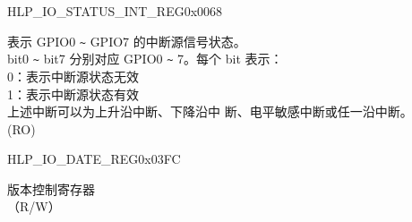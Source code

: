 \begin{register}{H}{LP\_IO\_STATUS\_INT\_REG}{0x0068}\label{regdesc:LPIOSTATUSINTREG}
%
%
\regnewline%
\begin{regdesc}\begin{reglist}
\label{fielddesc:LPGPIOSTATUSINTNEXT}\item [LP\_GPIO\_STATUS\_INT\_NEXT] 表示 GPIO0 \verb+~+ GPIO7 的中断源信号状态。\\
bit0 \verb+~+ bit7 分别对应 GPIO0 \verb+~+ 7。每个 bit 表示：\\
0：表示中断源状态无效\\
1：表示中断源状态有效\\
上述中断可以为上升沿中断、下降沿中
断、电平敏感中断或任一沿中断。\\  (RO)
\end{reglist}\end{regdesc}
\end{register}




\begin{register}{H}{LP\_IO\_DATE\_REG}{0x03FC}\label{regdesc:LPIODATEREG}
%
%
\regnewline%
\begin{regdesc}\begin{reglist}
\label{fielddesc:LPIODATE}\item [LP\_IO\_DATE] 版本控制寄存器 \\（R/W）
\end{reglist}\end{regdesc}
\end{register}
